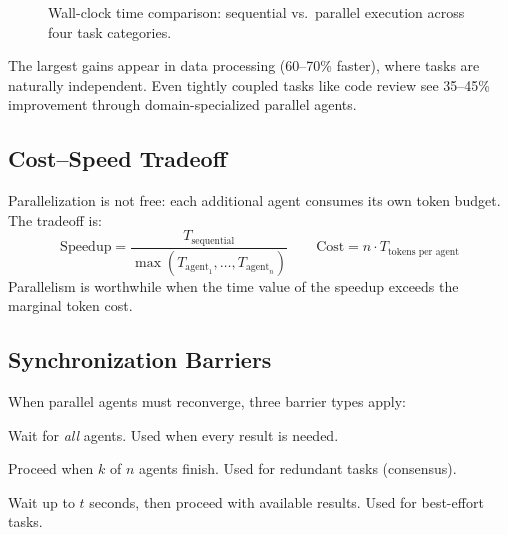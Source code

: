 \documentclass[11pt,letterpaper,twocolumn]{article}
\begin{document}
\begin{figure}[t]
\centering
{}
\caption{Wall-clock time comparison: sequential vs.\ parallel execution
  across four task categories.}
\label{fig:perf-comparison}
\end{figure}

The largest gains appear in data processing (60--70\% faster), where tasks
are naturally independent.  Even tightly coupled tasks like code review see
35--45\% improvement through domain-specialized parallel agents.

\subsection{Cost--Speed Tradeoff}

Parallelization is not free: each additional agent consumes its own token
budget.  The tradeoff is:
\[
  \text{Speedup} = \frac{T_{\text{sequential}}}
    {\max(T_{\text{agent}_1}, \ldots, T_{\text{agent}_n})}
  \qquad
  \text{Cost} = n \cdot T_{\text{tokens per agent}}
\]
Parallelism is worthwhile when the time value of the speedup exceeds the
marginal token cost.

\subsection{Synchronization Barriers}

When parallel agents must reconverge, three barrier types apply:

\begin{description}[leftmargin=0pt,itemsep=2pt]
  \item[Full barrier.] Wait for \emph{all} agents.  Used when every result
    is needed.
  \item[Partial barrier ($k$-of-$n$).] Proceed when $k$ of $n$ agents
    finish.  Used for redundant tasks (consensus).
  \item[Timeout barrier.] Wait up to $t$ seconds, then proceed with
    available results.  Used for best-effort tasks.
\end{description}
\end{document}
